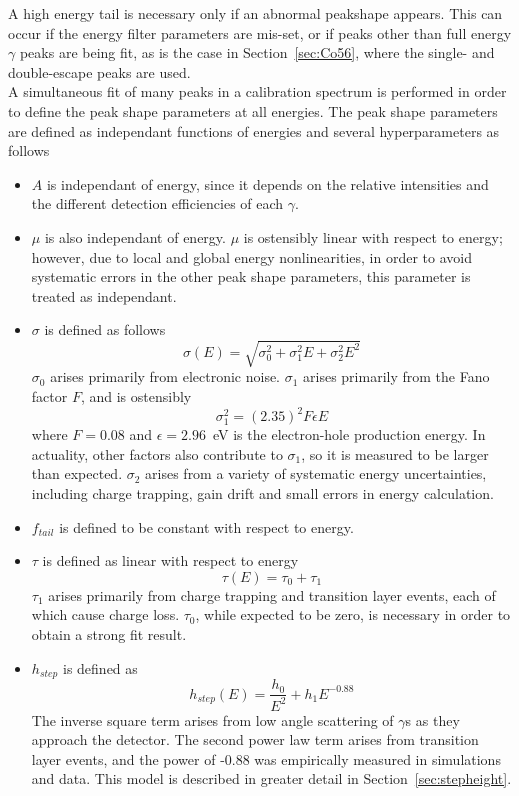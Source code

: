 \documentclass[/main.tex]{subfiles}
\begin{document}
A high energy tail is necessary only if an abnormal peakshape appears.
This can occur if the energy filter parameters are mis-set, or if peaks other than full energy $\gamma$ peaks are being fit, as is the case in Section~\ref{sec:Co56}, where the single- and double-escape peaks are used.
\\
A simultaneous fit of many peaks in a calibration spectrum is performed in order to define the peak shape parameters at all energies.
The peak shape parameters are defined as independant functions of energies and several hyperparameters as follows
\begin{itemize}
\item $A$ is independant of energy, since it depends on the relative intensities and the different detection efficiencies of each $\gamma$.
\item $\mu$ is also independant of energy.
  $\mu$ is ostensibly linear with respect to energy; however, due to local and global energy nonlinearities, in order to avoid systematic errors in the other peak shape parameters, this parameter is treated as independant.
\item $\sigma$ is defined as follows
  \begin{equation}
    \sigma(E) = \sqrt{\sigma_0^2 + \sigma_1^2E + \sigma_2^2E^2}
  \end{equation}
  $\sigma_0$ arises primarily from electronic noise. $\sigma_1$ arises primarily from the Fano factor $F$, and is ostensibly
  \begin{equation}
    \sigma_1^2 = (2.35)^2F\epsilon E
  \end{equation}
  where $F=0.08$ and $\epsilon=2.96$~eV is the electron-hole production energy.
  In actuality, other factors also contribute to $\sigma_1$, so it is measured to be larger than expected.
  $\sigma_2$ arises from a variety of systematic energy uncertainties, including charge trapping, gain drift and small errors in energy calculation.
\item $f_{tail}$ is defined to be constant with respect to energy.
\item $\tau$ is defined as linear with respect to energy
  \begin{equation}
    \tau(E) = \tau_0 + \tau_1
  \end{equation}
  $\tau_1$ arises primarily from charge trapping and transition layer events, each of which cause charge loss.
  $\tau_0$, while expected to be zero, is necessary in order to obtain a strong fit result.
\item $h_{step}$ is defined as
  \begin{equation}
    h_{step}(E) = \frac{h_0}{E^2} + h_1E^{-0.88}
  \end{equation}
  The inverse square term arises from low angle scattering of $\gamma$s as they approach the detector.
  The second power law term arises from transition layer events, and the power of -0.88 was empirically measured in simulations and data.
  This model is described in greater detail in Section~\ref{sec:stepheight}.
\end{itemize}
\end{document}
